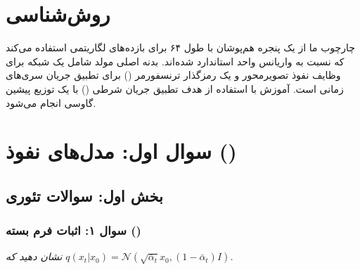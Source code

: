 \section{روش‌شناسی}
چارچوب ما از یک پنجره هم‌پوشان با طول ۶۴ برای بازده‌های لگاریتمی  استفاده می‌کند که نسبت به واریانس واحد استاندارد شده‌اند. بدنه اصلی مولد شامل یک شبکه  برای وظایف نفوذ تصویر‌محور و یک رمزگذار ترنسفورمر () برای تطبیق جریان سری‌های زمانی است. آموزش با استفاده از هدف تطبیق جریان شرطی () با یک توزیع پیشین گاوسی انجام می‌شود.

\section{سوال اول: مدل‌های نفوذ ()}

\subsection{بخش اول: سوالات تئوری}

\subsubsection{سوال ۱: اثبات فرم بسته ()}
\textit{نشان دهید که $q(x_t | x_0) = \mathcal{N}(\sqrt{\bar{\alpha}_t} x_0, (1 - \bar{\alpha}_t) I)$.}

